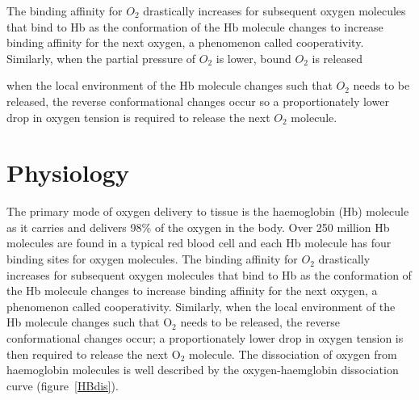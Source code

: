 The binding affinity for ${O_2}$ drastically increases for subsequent oxygen molecules that bind to \acs{Hb} as the conformation of the \acs{Hb} molecule changes to increase binding affinity for the next oxygen, a phenomenon called cooperativity. 
Similarly, when the partial pressure of ${O_2}$ is lower, bound ${O_2}$ is released 

when the local environment of the \acs{Hb} molecule changes such that ${O_2}$ needs to be released, the reverse conformational changes occur so a proportionately lower drop in oxygen tension is required to release the next ${O_2}$ molecule. 

\section{Physiology}

The primary mode of oxygen delivery to tissue is the haemoglobin (\acs{Hb}) molecule as it carries and delivers 98\% of the oxygen in the body. 
Over 250 million \acs{Hb} molecules are found in a typical red blood cell and each \acs{Hb} molecule has four binding sites for oxygen molecules. 
The binding affinity for ${O_2}$ drastically increases for subsequent oxygen molecules that bind to \acs{Hb} as the conformation of the \acs{Hb} molecule changes to increase binding affinity for the next oxygen, a phenomenon called cooperativity. 
Similarly, when the local environment of the \acs{Hb} molecule changes such that O$_2$ needs to be released, the reverse conformational changes occur; a proportionately lower drop in oxygen tension is then required to release the next O$_2$ molecule. 
The dissociation of oxygen from haemoglobin molecules is well described by the oxygen-haemglobin dissociation curve (figure~\ref{HBdis}).

